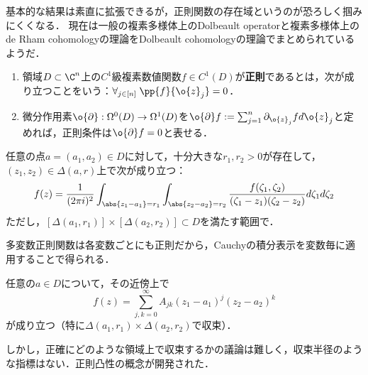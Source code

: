 \documentclass[uplatex, dvipdfmx]{jsreport}
\begin{document}
\begin{tcolorbox}[colframe=ForestGreen, colback=ForestGreen!10!white,breakable,colbacktitle=ForestGreen!40!white,coltitle=black,fonttitle=\bfseries\sffamily,
title=一変数と多変数で同じところ]
    基本的な結果は素直に拡張できるが，正則関数の存在域というのが恐ろしく掴みにくくなる．
    現在は一般の複素多様体上のDolbeault operatorと複素多様体上のde Rham cohomologyの理論をDolbeault cohomologyの理論でまとめられているようだ．
\end{tcolorbox}

\begin{definition}\mbox{}
    \begin{enumerate}
        \item 領域$D\subset\C^n$上の$C^1$級複素数値関数$f\in C^1(D)$が\textbf{正則}であるとは，次が成り立つことをいう：$\forall_{j\in[n]}\;\pp{f}{\o{z}_j}=0$．
        \item 微分作用素$\o{\partial}:\Omega^0(D)\to\Omega^1(D)$を$\o{\partial}f:=\sum_{j=1}^n\partial_{\o{z}_j}fd\o{z}_j$と定めれば，正則条件は$\o{\partial}f=0$と表せる．
    \end{enumerate}
\end{definition}

\begin{theorem}[Cauchyの積分表示]\label{thm-Cauchy-integral-expression-multivariable}
    任意の点$a=(a_1,a_2)\in D$に対して，十分大きな$r_1,r_2>0$が存在して，$(z_1,z_2)\in\Delta(a,r)$上で次が成り立つ：
    \[f(z)=\frac{1}{(2\pi i)^2}\int_{\abs{z_1-a_1}=r_1}\int_{\abs{z_2-a_2}=r_2}\frac{f(\zeta_1,\zeta_2)}{(\zeta_1-z_1)(\zeta_2-z_2)}d\zeta_1d\zeta_2\]
    ただし，$[\Delta(a_1,r_1)]\times[\Delta(a_2,r_2)]\subset D$を満たす範囲で．
\end{theorem}
\begin{Proof}
    多変数正則関数は各変数ごとにも正則だから，Cauchyの積分表示を変数毎に適用することで得られる．
\end{Proof}

\begin{theorem}[多変数複素関数の冪級数展開]
    任意の$a\in D$について，その近傍上で
    \[f(z)=\sum_{j,k=0}^\infty A_{jk}(z_1-a_1)^j(z_2-a_2)^k\]
    が成り立つ（特に$\Delta(a_1,r_1)\times\Delta(a_2,r_2)$で収束）．
\end{theorem}
\begin{remark}
    しかし，正確にどのような領域上で収束するかの議論は難しく，収束半径のような指標はない．正則凸性の概念が開発された．
\end{remark}
\end{document}
